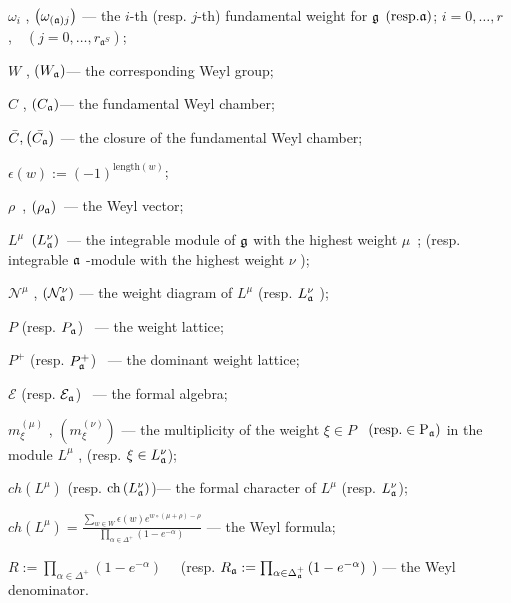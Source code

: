 \documentclass[12pt]{article}
\begin{document}
$\omega _{i}$ , $\left( \omega _{\left( \frak{a}\right) j}\right) $ --- the $%
i$-th (resp. $j$-th) fundamental weight for $\frak{g}$ $\left( \mathrm{{resp.}\frak{%
a}}\right) $; $i=0,\ldots ,r$,\ \ $\left( j=0,\ldots ,r_{\mathfrak{a}%
^S}\right) $;

$W$ , $\left( W_{\frak{a}}\right) $--- the corresponding Weyl group;

$C$ , $\left( C_{\frak{a}}\right) $--- the fundamental Weyl chamber;

$\bar{C}, \left(\bar{C_{\frak{a}}}\right)$ --- the closure of the
fundamental Weyl chamber;

$\epsilon \left( w\right) :=\left( -1\right) ^{\mathrm{length}(w)}$;

$\rho $\ , $\left( \rho _{\frak{a}}\right) $\ --- the Weyl vector;

$L^{\mu }$\ $\left( L_{\frak{a}}^{\nu }\right) $\ --- the integrable module
of $\frak{g}$ with the highest weight $\mu $\ ; (resp. integrable $\frak{a}$
-module with the highest weight $\nu $ );

$\mathcal{N}^{\mu }$ , $\left( \mathcal{N}_{\frak{a}}^{\nu }\right) $ ---
the weight diagram of $L^{\mu }$ (resp. ${}L_{\frak{a}}^{\nu }$ );

$P$ (resp. $P_{\frak{a}} $) \ --- the weight lattice;

$P^{+}$ (resp. $P_{\frak{a}}^{+} $) \ --- the dominant weight lattice;

$\mathcal{E}$ (resp. $\mathcal{E}_{\frak{a}} $) \ --- the formal algebra;

$m_{\xi }^{\left( \mu \right) }$ , $\left( m_{\xi }^{\left( \nu \right)
}\right) $ --- the multiplicity of the weight $\xi \in P$ \ $\left( \mathrm{{%
resp. }\in P_{\frak{a}}}\right) $ in the module $L^{\mu }$ , (resp. $\xi \in
L_{\frak{a}}^{\nu } $);

$ch\left( L^{\mu }\right) $ (resp. $\mathrm{ch}\left( L_{\frak{a}}^{\nu
}\right) $)--- the formal character of $L^{\mu }$ (resp. $L_{\frak{a}}^{\nu
} $);

$ch\left( L^{\mu }\right)  =\frac{\sum_{w\in W}\epsilon (w)e^{w\circ (\mu
+\rho )-\rho }} {\prod_{\alpha \in \Delta ^{+}} \left( 1-e^{-\alpha }\right)
} $ --- the Weyl formula;

$R:=\prod_{\alpha \in \Delta ^{+}}\left( 1-e^{-\alpha }\right) \quad $
(resp. $R_{\frak{a}}: =\prod_{\alpha \in \Delta_{\frak{a}}^{+}} \left(
1-e^{-\alpha }\right) $ ) --- the Weyl denominator.
\end{document}

